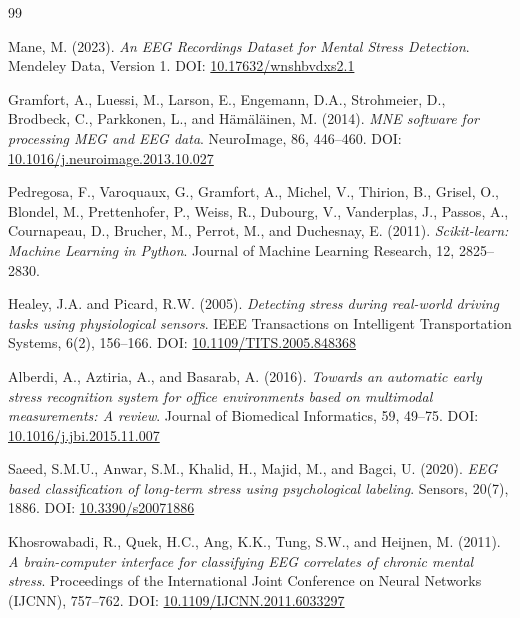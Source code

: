 \documentclass[12pt,a4paper]{article}
\begin{document}
	\newpage
	\begin{thebibliography}{99}

		Mane, M. (2023).
		\textit{An EEG Recordings Dataset for Mental Stress Detection}.
		Mendeley Data, Version 1.
		DOI: \href{https://doi.org/10.17632/wnshbvdxs2.1}{10.17632/wnshbvdxs2.1}

		Gramfort, A., Luessi, M., Larson, E., Engemann, D.A., Strohmeier, D., Brodbeck, C., Parkkonen, L., and Hämäläinen, M. (2014).
		\textit{MNE software for processing MEG and EEG data}.
		NeuroImage, 86, 446--460.
		DOI: \href{https://doi.org/10.1016/j.neuroimage.2013.10.027}{10.1016/j.neuroimage.2013.10.027}

		Pedregosa, F., Varoquaux, G., Gramfort, A., Michel, V., Thirion, B., Grisel, O., Blondel, M., Prettenhofer, P., Weiss, R., Dubourg, V., Vanderplas, J., Passos, A., Cournapeau, D., Brucher, M., Perrot, M., and Duchesnay, E. (2011).
		\textit{Scikit-learn: Machine Learning in Python}.
		Journal of Machine Learning Research, 12, 2825--2830.

		Healey, J.A. and Picard, R.W. (2005).
		\textit{Detecting stress during real-world driving tasks using physiological sensors}.
		IEEE Transactions on Intelligent Transportation Systems, 6(2), 156--166.
		DOI: \href{https://doi.org/10.1109/TITS.2005.848368}{10.1109/TITS.2005.848368}

		Alberdi, A., Aztiria, A., and Basarab, A. (2016).
		\textit{Towards an automatic early stress recognition system for office environments based on multimodal measurements: A review}.
		Journal of Biomedical Informatics, 59, 49--75.
		DOI: \href{https://doi.org/10.1016/j.jbi.2015.11.007}{10.1016/j.jbi.2015.11.007}

		Saeed, S.M.U., Anwar, S.M., Khalid, H., Majid, M., and Bagci, U. (2020).
		\textit{EEG based classification of long-term stress using psychological labeling}.
		Sensors, 20(7), 1886.
		DOI: \href{https://doi.org/10.3390/s20071886}{10.3390/s20071886}

		Khosrowabadi, R., Quek, H.C., Ang, K.K., Tung, S.W., and Heijnen, M. (2011).
		\textit{A brain-computer interface for classifying EEG correlates of chronic mental stress}.
		Proceedings of the International Joint Conference on Neural Networks (IJCNN), 757--762.
		DOI: \href{https://doi.org/10.1109/IJCNN.2011.6033297}{10.1109/IJCNN.2011.6033297}


\end{thebibliography}
\end{document}
